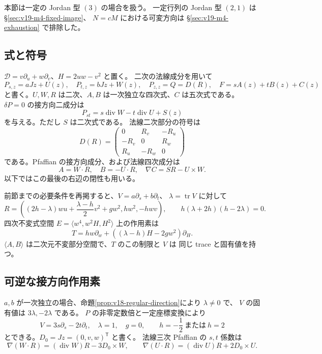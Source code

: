\documentclass[11pt,a4paper]{ltjsarticle}
\theoremstyle{remark}\newtheorem{remark}[theorem]{注意}
\begin{document}
本節は一定の Jordan 型 $(3)$ の場合を扱う。
一定行列の Jordan 型 $(2,1)$ は \S\ref{sec:v19-m4-fixed-image}、
$N=cM$ における可変方向は \S\ref{sec:v19-m4-exhaustion} で排除した。

\subsection{式と符号}

$\mathcal D=v\partial_u+w\partial_v$、$H=2uw-v^2$ と置く。
二次の法線成分を用いて
\[
 P_{s,z}=aJz+U(z),\quad P_{t,z}=bJz+W(z),\quad
 P_{z,z}=Q=D(R),\quad
 F=sA(z)+tB(z)+C(z)
\]
と書く。$U,W,R$ は二次、$A,B$ は一次独立な四次式、$C$ は五次式である。
$\delta P=0$ の接方向二成分は
\begin{equation}\label{eq:v19-st-div}
 P_{st}=s\operatorname{div}W-t\operatorname{div}U+S(z)
\end{equation}
を与える。ただし $S$ は二次式である。
法線二次部分の符号は
\[
 D(R)=\begin{pmatrix}0&R_v&-R_u\\-R_v&0&R_w\\R_u&-R_w&0\end{pmatrix}
\]
である。Pfaffian の接方向成分、および法線四次成分は
\begin{equation}\label{eq:v19-pfaff-pure}
 A=W\cdot R,\quad B=-U\cdot R,\quad
 \nabla C=S R-U\times W.
\end{equation}
以下ではこの最後の右辺の閉性も用いる。

前節までの必要条件を再掲すると、$V=a\partial_s+b\partial_t$、
$\lambda=\operatorname{tr}V$ に対して
\[
 R=\left((2h-\lambda)wu+\frac{\lambda-h}{2}v^2+gw^2,
          hw^2,-hwv\right),\qquad
 h(\lambda+2h)(h-2\lambda)=0.
\]
四次不変式空間 $E=\langle w^4,w^2H,H^2\rangle$ 上の作用素は
\[
 T=hw\partial_w+((\lambda-h)H-2gw^2)\partial_H.
\]
$\langle A,B\rangle$ は二次元不変部分空間で、$T$ のこの制限と $V$ は
同じ trace と固有値を持つ。

\subsection{可逆な接方向作用素}

$a,b$ が一次独立の場合、命題\ref{prop:v18-regular-direction}により $\lambda\ne0$ で、
$V$ の固有値は $3\lambda,-2\lambda$ である。
$P$ の非零定数倍と一定座標変換により
\[
 V=3s\partial_s-2t\partial_t,\quad\lambda=1,\quad g=0,
 \qquad h=-\frac12\ \text{または}\ h=2
\]
とできる。$D_0=Jz=(0,v,w)^{\mathsf T}$ と書く。
法線三次 Pfaffian の $s,t$ 係数は
\begin{equation}\label{eq:v19-linear-UW}
 \nabla(W\cdot R)=(\operatorname{div}W)R-3D_0\times W,
 \qquad
 \nabla(U\cdot R)=(\operatorname{div}U)R+2D_0\times U.
\end{equation}
\end{document}
